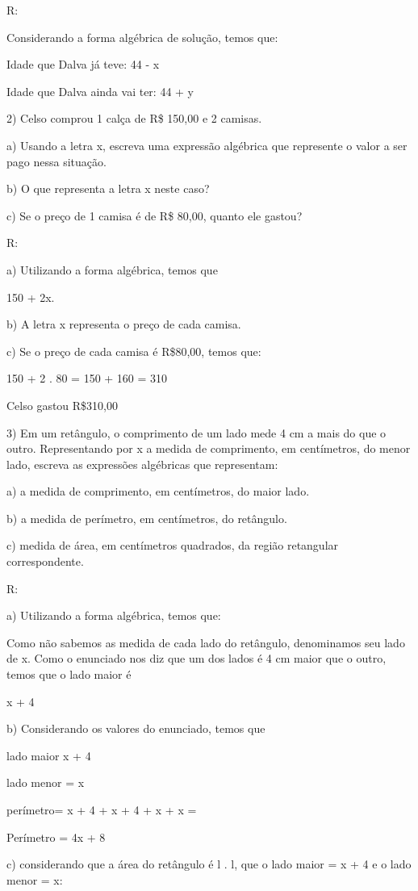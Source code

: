 R:

Considerando a forma algébrica de solução, temos que:

Idade que Dalva já teve: 44 - x

Idade que Dalva ainda vai ter: 44 + y

2) Celso comprou 1 calça de R\$ 150,00 e 2 camisas.

a) Usando a letra x, escreva uma expressão algébrica que represente o
valor a ser pago nessa situação.

b) O que representa a letra x neste caso?

c) Se o preço de 1 camisa é de R\$ 80,00, quanto ele gastou?

R:

a) Utilizando a forma algébrica, temos que

150 + 2x.

b) A letra x representa o preço de cada camisa.

c) Se o preço de cada camisa é R\$80,00, temos que:

150 + 2 . 80 = 150 + 160 = 310

Celso gastou R\$310,00

3) Em um retângulo, o comprimento de um lado mede 4 cm a mais do que o
outro. Representando por x a medida de comprimento, em centímetros, do
menor lado, escreva as expressões algébricas que representam:

a) a medida de comprimento, em centímetros, do maior lado.

b) a medida de perímetro, em centímetros, do retângulo.

c) medida de área, em centímetros quadrados, da região retangular
correspondente.

R:

a) Utilizando a forma algébrica, temos que:

Como não sabemos as medida de cada lado do retângulo, denominamos seu
lado de x. Como o enunciado nos diz que um dos lados é 4 cm maior que o
outro, temos que o lado maior é

x + 4

b) Considerando os valores do enunciado, temos que

lado maior x + 4

lado menor = x

perímetro= x + 4 + x + 4 + x + x =

Perímetro = 4x + 8

c) considerando que a área do retângulo é l . l, que o lado maior = x +
4 e o lado menor = x:

